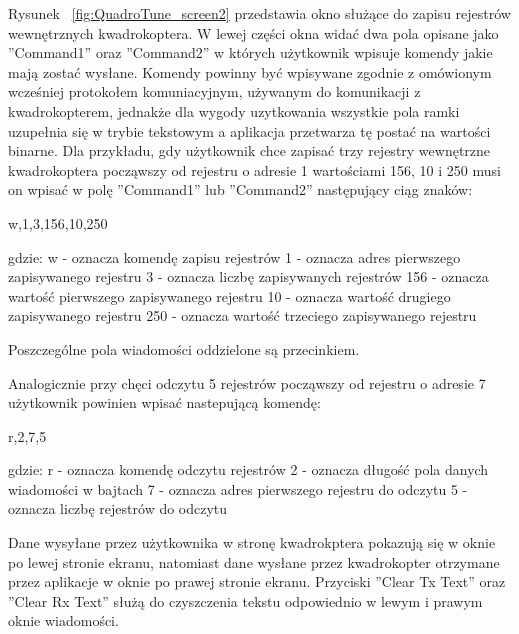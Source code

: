 Rysunek ~\ref{fig:QuadroTune_screen2} przedstawia okno służące do zapisu rejestrów wewnętrznych kwadrokoptera. W lewej części okna widać dwa pola opisane jako ''Command1'' oraz ''Command2'' w których użytkownik wpisuje komendy jakie mają zostać wysłane. Komendy powinny być wpisywane zgodnie z omówionym wcześniej protokołem komuniacyjnym, używanym do komunikacji z kwadrokopterem, jednakże dla wygody uzytkowania wszystkie pola ramki uzupełnia się w trybie tekstowym a aplikacja przetwarza tę postać na wartości binarne. Dla przykładu, gdy użytkownik chce zapisać trzy rejestry wewnętrzne kwadrokoptera począwszy od rejestru o adresie 1 wartościami 156, 10 i 250 musi on wpisać w polę ''Command1'' lub ''Command2'' następujący ciąg znaków:

w,1,3,156,10,250

gdzie:
w - oznacza komendę zapisu rejestrów
1 - oznacza adres pierwszego zapisywanego rejestru
3 - oznacza liczbę zapisywanych rejestrów
156 - oznacza wartość pierwszego zapisywanego rejestru  
10 - oznacza wartość drugiego zapisywanego rejestru
250 - oznacza wartość trzeciego zapisywanego rejestru

Poszczególne pola wiadomości oddzielone są przecinkiem.

Analogicznie przy chęci odczytu 5 rejestrów począwszy od rejestru o adresie 7 użytkownik powinien wpisać nastepującą komendę:

r,2,7,5

gdzie:
r - oznacza komendę odczytu rejestrów
2 - oznacza długość pola danych wiadomości w bajtach
7 - oznacza adres pierwszego rejestru do odczytu
5 - oznacza liczbę rejestrów do odczytu

Dane wysyłane przez użytkownika w stronę kwadrokptera pokazują się w oknie po lewej stronie ekranu, natomiast dane wysłane przez kwadrokopter  otrzymane przez aplikacje w oknie po prawej stronie ekranu. Przyciski ''Clear Tx Text'' oraz ''Clear Rx Text'' służą do czyszczenia tekstu odpowiednio w lewym i prawym oknie wiadomości. 

